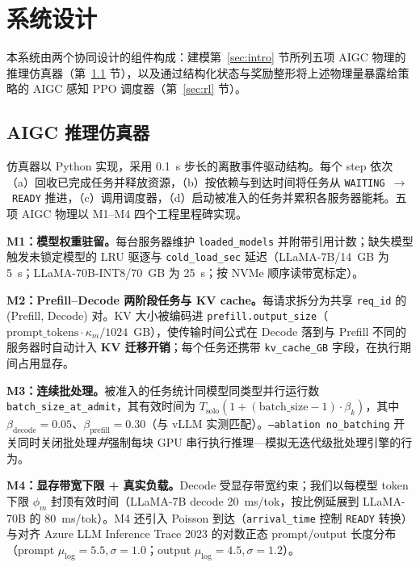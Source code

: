 \section{系统设计}
\label{sec:system}

本系统由两个协同设计的组件构成：建模第~\ref{sec:intro} 节所列五项 AIGC 物理的推理仿真器（第~\ref{sec:simulator} 节），以及通过结构化状态与奖励整形将上述物理量暴露给策略的 AIGC 感知 PPO 调度器（第~\ref{sec:rl} 节）。

\subsection{AIGC 推理仿真器}
\label{sec:simulator}

仿真器以 Python 实现，采用 0.1~s 步长的离散事件驱动结构。每个 step 依次（a）回收已完成任务并释放资源，（b）按依赖与到达时间将任务从 \texttt{WAITING}~$\to$~\texttt{READY} 推进，（c）调用调度器，（d）启动被准入的任务并累积各服务器能耗。五项 AIGC 物理以 M1--M4 四个工程里程碑实现。

\textbf{M1：模型权重驻留。}每台服务器维护 \texttt{loaded\_models} 并附带引用计数；缺失模型触发未锁定模型的 LRU 驱逐与 \texttt{cold\_load\_sec} 延迟（LLaMA-7B/14~GB 为 5~s；LLaMA-70B-INT8/70~GB 为 25~s；按 NVMe 顺序读带宽标定）。

\textbf{M2：Prefill--Decode 两阶段任务与 KV cache。}每请求拆分为共享 \texttt{req\_id} 的 (Prefill, Decode) 对。KV 大小被编码进 \texttt{prefill.output\_size}（$\text{prompt\_tokens}\cdot\kappa_m/1024$~GB），使传输时间公式在 Decode 落到与 Prefill 不同的服务器时自动计入 \textbf{KV 迁移开销}；每个任务还携带 \texttt{kv\_cache\_GB} 字段，在执行期间占用显存。

\textbf{M3：连续批处理。}被准入的任务统计同模型同类型并行运行数 \texttt{batch\_size\_at\_admit}，其有效时间为 $T_{\text{solo}}(1+(\text{batch\_size}-1)\cdot\beta_k)$，其中 $\beta_{\text{decode}}{=}0.05$、$\beta_{\text{prefill}}{=}0.30$（与 vLLM 实测匹配）。\texttt{--ablation no\_batching} 开关同时关闭批处理\emph{并}强制每块 GPU 串行执行推理---模拟无迭代级批处理引擎的行为。

\textbf{M4：显存带宽下限 + 真实负载。}Decode 受显存带宽约束；我们以每模型 token 下限 $\phi_m$ 封顶有效时间（LLaMA-7B decode 20~ms/tok，按比例延展到 LLaMA-70B 的 80~ms/tok）。M4 还引入 Poisson 到达（\texttt{arrival\_time} 控制 \texttt{READY} 转换）与对齐 Azure LLM Inference Trace 2023 的对数正态 prompt/output 长度分布（prompt $\mu_{\log}{=}5.5,\sigma{=}1.0$；output $\mu_{\log}{=}4.5,\sigma{=}1.2$）。

